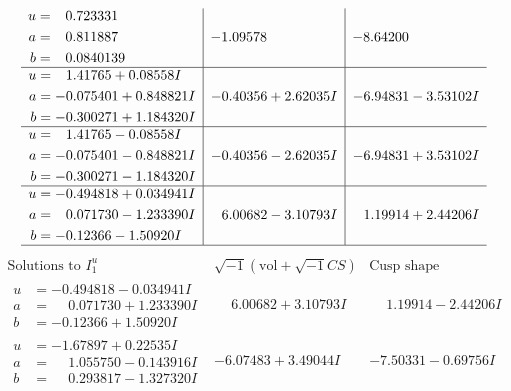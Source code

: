 \documentclass[1p]{elsarticle_modified}
\theoremstyle{definition}
\newcommand{\I}{\sqrt{-1}}
\begin{document}
$$\begin{array}{c|c|c}
\begin{aligned}
u &= \phantom{-}0.723331\phantom{ +0.000000I} \\
a &= \phantom{-}0.811887\phantom{ +0.000000I} \\
b &= \phantom{-}0.0840139\phantom{ +0.000000I}\end{aligned}
 & -1.09578\phantom{ +0.000000I} & -8.64200\phantom{ +0.000000I} \\ \hline\begin{aligned}
u &= \phantom{-}1.41765 + 0.08558 I \\
a &= -0.075401 + 0.848821 I \\
b &= -0.300271 + 1.184320 I\end{aligned}
 & -0.40356 + 2.62035 I & -6.94831 - 3.53102 I \\ \hline\begin{aligned}
u &= \phantom{-}1.41765 - 0.08558 I \\
a &= -0.075401 - 0.848821 I \\
b &= -0.300271 - 1.184320 I\end{aligned}
 & -0.40356 - 2.62035 I & -6.94831 + 3.53102 I \\ \hline\begin{aligned}
u &= -0.494818 + 0.034941 I \\
a &= \phantom{-}0.071730 - 1.233390 I \\
b &= -0.12366 - 1.50920 I\end{aligned}
 & \phantom{-}6.00682 - 3.10793 I & \phantom{-}1.19914 + 2.44206 I\\
 \hline 
 \end{array}$$\newpage$$\begin{array}{c|c|c}  
\text{Solutions to }I^u_{1}& \I (\text{vol} + \sqrt{-1}CS) & \text{Cusp shape}\\
 \hline 
\begin{aligned}
u &= -0.494818 - 0.034941 I \\
a &= \phantom{-}0.071730 + 1.233390 I \\
b &= -0.12366 + 1.50920 I\end{aligned}
 & \phantom{-}6.00682 + 3.10793 I & \phantom{-}1.19914 - 2.44206 I \\ \hline\begin{aligned}
u &= -1.67897 + 0.22535 I \\
a &= \phantom{-}1.055750 - 0.143916 I \\
b &= \phantom{-}0.293817 - 1.327320 I\end{aligned}
 & -6.07483 + 3.49044 I & -7.50331 - 0.69756 I \\ \hline\begin{aligned}

\end{aligned}
\end{array}$$
\end{document}
